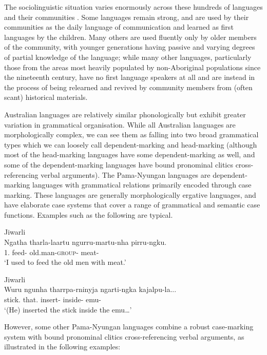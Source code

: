 \documentclass[output=paper,hidelinks]{langscibook}
\begin{document}
The sociolinguistic situation varies enormously across these hundreds of languages and their communities \citep{NILR2020}. Some languages remain strong, and are used by their communities as the daily language of communication and learned as first languages by the children. Many others are used fluently only by older members of the community, with younger generations having passive and varying degrees of partial knowledge of the language; while many other languages, particularly those from the areas most heavily populated by non-Aboriginal populations since the nineteenth century, have no first language speakers at all and are instead in the process of being relearned and revived by community members from (often scant) historical materials.

Australian languages are relatively similar phonologically \citep{FletchButch2014} but exhibit greater variation in grammatical organisation. While all Australian languages are morphologically complex, we can see them as falling into two broad grammatical types which we can loosely call dependent-marking and head-marking \citep{Nichols86} (although most of the head-marking languages have some dependent-marking as well, and some of the dependent-marking languages have bound pronominal clitics cross-referencing verbal arguments). The Pama-Nyungan languages are dependent-marking languages with grammatical relations primarily encoded through case marking. These languages are generally morphologically ergative languages, and have elaborate case systems that cover a range of grammatical and semantic case functions. Examples such as the following are typical. 

\ea\label{ex:Australian:1} Jiwarli\\
\gll Ngatha tharla-laartu ngurru-martu-nha pirru-ngku.\\
{1\SG.\ERG} {feed-\USIT}	{old.man-\textsc{group}-\ACC} {meat-\ERG}\\
\glt `I used to feed the old men with meat.’ \citep[310]{Austin01}	
\z

\ea Jiwarli\\
\gll Wuru ngunha tharrpa-rninyja ngarti-ngka kajalpu-la...\\
 {stick.\ACC} {that.\ACC} {insert-\PST} {inside-\LOC} {emu-\LOC}\\
\glt `(He) inserted the stick inside the emu…’ \citep[315]{Austin01}
\z

However, some other Pama-Nyungan languages combine a robust case-mar\-king system with bound pronominal clitics cross-referencing verbal arguments, as illustrated in the following examples:
\end{document}
